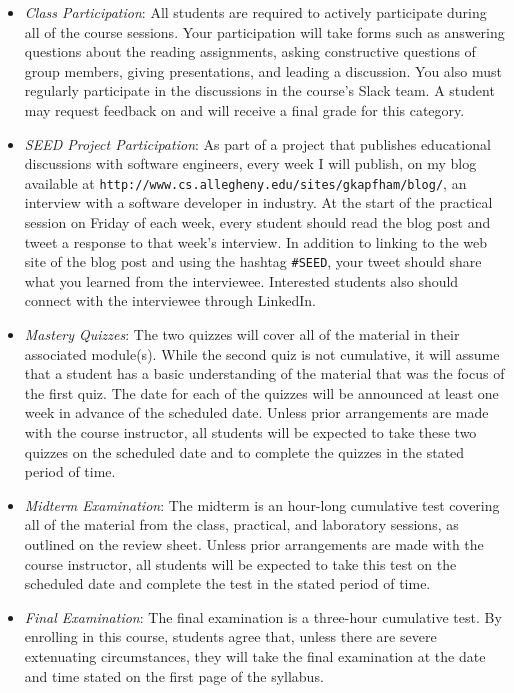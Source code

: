 \documentclass[11pt]{article}
\newcommand{\url}[1]{\lstinline{#1}}
\begin{document}
\begin{itemize}

  \item {\em Class Participation\/}: All students are required to actively participate during all of the course
    sessions. Your participation will take forms such as answering questions about the reading assignments, asking
    constructive questions of group members, giving presentations, and leading a discussion. You also must regularly
    participate in the discussions in the course's Slack team. A student may request feedback on and will receive a
    final grade for this category.

  \item {\em SEED Project Participation\/}: As part of a project that publishes educational discussions with software
    engineers, every week I will publish, on my blog available at
    \url{http://www.cs.allegheny.edu/sites/gkapfham/blog/}, an interview with a software developer in industry. At the
    start of the practical session on Friday of each week, every student should read the blog post and tweet a response
    to that week's interview. In addition to linking to the web site of the blog post and using the hashtag \url{#SEED},
    your tweet should share what you learned from the interviewee. Interested students also should connect with the
    interviewee through LinkedIn.

  \item {\em Mastery Quizzes\/}: The two quizzes will cover all of the material in their associated module(s). While the
    second quiz is not cumulative, it will assume that a student has a basic understanding of the material that was the
    focus of the first quiz. The date for each of the quizzes will be announced at least one week in advance of the
    scheduled date. Unless prior arrangements are made with the course instructor, all students will be expected to take
    these two quizzes on the scheduled date and to complete the quizzes in the stated period of time.

  \item {\em Midterm Examination\/}: The midterm is an hour-long cumulative test covering all of the material from the
    class, practical, and laboratory sessions, as outlined on the review sheet. Unless prior arrangements are made with
    the course instructor, all students will be expected to take this test on the scheduled date and complete the test
    in the stated period of time.

  \item {\em Final Examination\/}: The final examination is a three-hour cumulative test. By enrolling in this course,
    students agree that, unless there are severe extenuating circumstances, they will take the final examination at the
    date and time stated on the first page of the syllabus.


\end{itemize}
\end{document}
